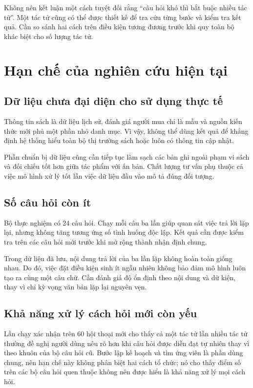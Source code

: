 Không nên kết luận một cách tuyệt đối rằng ``câu hỏi khó thì bắt buộc nhiều tác tử''. Một tác tử cũng có thể được thiết kế để tra cứu từng bước và kiểm tra kết quả. Cần so sánh hai cách trên điều kiện tương đương trước khi quy toàn bộ khác biệt cho số lượng tác tử.

\section{Hạn chế của nghiên cứu hiện tại}

\subsection{Dữ liệu chưa đại diện cho sử dụng thực tế}
Thông tin sách là dữ liệu lịch sử, đánh giá người mua chỉ là mẫu và nguồn kiến thức mới phủ một phần nhỏ danh mục. Vì vậy, không thể dùng kết quả để khẳng định hệ thống hiểu toàn bộ thị trường sách hoặc luôn có thông tin cập nhật.

Phần chuẩn bị dữ liệu cũng cần tiếp tục làm sạch các bản ghi ngoài phạm vi sách và đối chiếu tốt hơn giữa tác phẩm với ấn bản. Chất lượng tư vấn phụ thuộc cả việc mô hình xử lý tốt lẫn việc dữ liệu đầu vào mô tả đúng đối tượng.

\subsection{Số câu hỏi còn ít}
Bộ thực nghiệm có 24 câu hỏi. Chạy mỗi câu ba lần giúp quan sát việc trả lời lặp lại, nhưng không tăng tương ứng số tình huống độc lập. Kết quả cần được kiểm tra trên các câu hỏi mới trước khi mở rộng thành nhận định chung.

Trong dữ liệu đã lưu, nội dung trả lời của ba lần lặp không hoàn toàn giống nhau. Do đó, việc đặt điều kiện sinh ít ngẫu nhiên không bảo đảm mô hình luôn tạo ra cùng một câu chữ. Cần đánh giá độ ổn định theo nội dung và dữ kiện, thay vì chỉ kỳ vọng văn bản lặp lại nguyên vẹn.

\subsection{Khả năng xử lý cách hỏi mới còn yếu}
Lần chạy xác nhận trên 60 hội thoại mới cho thấy cả một tác tử lẫn nhiều tác tử thường đề nghị người dùng nêu rõ hơn khi câu hỏi được diễn đạt tự nhiên thay vì theo khuôn của bộ câu hỏi cũ. Bước lập kế hoạch và tìm ứng viên là phần dùng chung, nên hạn chế này không phân biệt hai cách tổ chức; nó cho thấy điểm số trên các bộ câu hỏi quen thuộc không nên được hiểu là khả năng xử lý mọi cách hỏi. 

